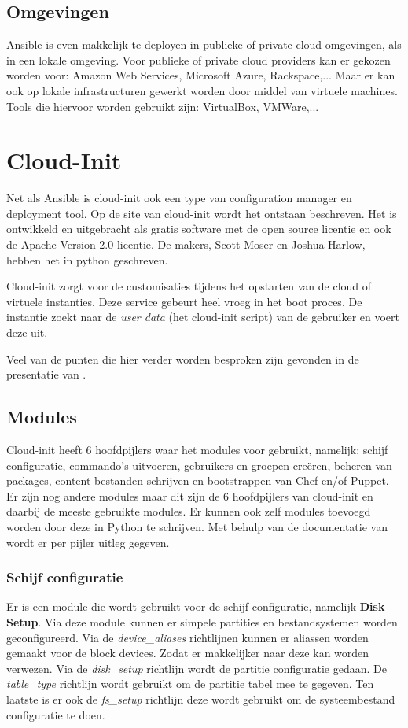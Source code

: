 \subsection{Omgevingen}
Ansible is even makkelijk te deployen in publieke of private cloud omgevingen, als in een lokale omgeving. Voor publieke of private cloud providers kan er gekozen worden voor: Amazon Web Services, Microsoft Azure, Rackspace,... Maar er kan ook op lokale infrastructuren gewerkt worden door middel van virtuele machines. Tools die hiervoor worden gebruikt zijn: VirtualBox, VMWare,...

\section{Cloud-Init}
\label{ch:cloud-init}
Net als Ansible is cloud-init ook een type van configuration manager en deployment tool. Op de site van cloud-init \autocite{cloudsite} wordt het ontstaan beschreven. Het is ontwikkeld en uitgebracht als gratis software met de open source licentie en ook de Apache Version 2.0 licentie. De makers, Scott Moser en Joshua Harlow, hebben het in python geschreven.

Cloud-init zorgt  voor de customisaties tijdens het opstarten van de cloud of virtuele instanties. Deze service gebeurt heel vroeg in het boot proces. De instantie zoekt naar de \textit{user data} (het cloud-init script) van de gebruiker en voert deze uit. 

Veel van de punten die hier verder worden besproken zijn gevonden in de presentatie van \autocite{cloudred}.

\subsection{Modules}
\label{ch:cloudmodules}
Cloud-init heeft 6 hoofdpijlers waar het modules voor gebruikt, namelijk: schijf configuratie, commando's uitvoeren, gebruikers en groepen creëren, beheren van packages, content bestanden schrijven en bootstrappen van Chef en/of Puppet. Er zijn nog andere modules maar dit zijn de 6 hoofdpijlers van cloud-init en daarbij de meeste gebruikte modules. Er kunnen ook zelf modules toevoegd worden door deze in Python te schrijven. Met behulp van de documentatie van \autocite{clouddocs} wordt er per pijler uitleg gegeven.

\subsubsection{Schijf configuratie}
Er is een module die wordt gebruikt voor de schijf configuratie, namelijk \textbf{Disk Setup}. Via deze module kunnen er simpele partities en bestandsystemen worden geconfigureerd. Via de \textit{device\_aliases} richtlijnen kunnen er aliassen worden gemaakt voor de block devices. Zodat er makkelijker naar deze kan worden verwezen. Via de \textit{disk\_setup} richtlijn wordt de partitie configuratie gedaan. De \textit{table\_type} richtlijn wordt gebruikt om de partitie tabel mee te gegeven. Ten laatste is er ook de \textit{fs\_setup} richtlijn deze wordt gebruikt om de systeembestand configuratie te doen.

